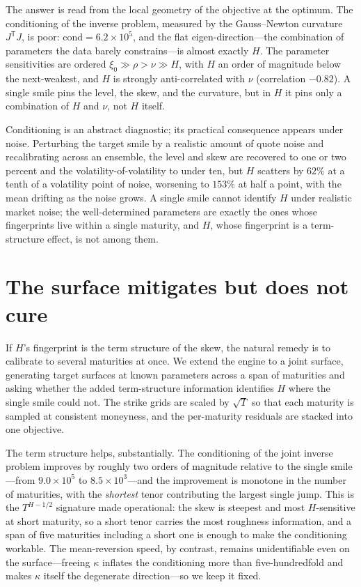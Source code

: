 \documentclass[11pt,a4paper]{article}
\numberwithin{equation}{section}
\begin{document}
The answer is read from the local geometry of the objective at the optimum. The conditioning of
the inverse problem, measured by the Gauss--Newton curvature $J^{\mathsf T}J$, is poor:
$\mathrm{cond}=6.2\times 10^{5}$, and the flat eigen-direction---the combination of parameters
the data barely constrains---is almost exactly $H$. The parameter sensitivities are ordered
$\xi_0 \gg \rho > \nu \gg H$, with $H$ an order of magnitude below the next-weakest, and $H$ is
strongly anti-correlated with $\nu$ (correlation $-0.82$). A single smile pins the level, the
skew, and the curvature, but in $H$ it pins only a combination of $H$ and $\nu$, not $H$ itself.

Conditioning is an abstract diagnostic; its practical consequence appears under noise. Perturbing
the target smile by a realistic amount of quote noise and recalibrating across an ensemble, the
level and skew are recovered to one or two percent and the volatility-of-volatility to under ten,
but $H$ scatters by $62\%$ at a tenth of a volatility point of noise, worsening to $153\%$ at half
a point, with the mean drifting as the noise grows. A single smile cannot identify $H$ under
realistic market noise; the well-determined parameters are exactly the ones whose fingerprints
live within a single maturity, and $H$, whose fingerprint is a term-structure effect, is not
among them.

\section{The surface mitigates but does not cure}\label{sec:surface}

If $H$'s fingerprint is the term structure of the skew, the natural remedy is to calibrate to
several maturities at once. We extend the engine to a joint surface, generating target surfaces
at known parameters across a span of maturities and asking whether the added term-structure
information identifies $H$ where the single smile could not. The strike grids are scaled by
$\sqrt{T}$ so that each maturity is sampled at consistent moneyness, and the per-maturity residuals
are stacked into one objective.

The term structure helps, substantially. The conditioning of the joint inverse problem improves by
roughly two orders of magnitude relative to the single smile---from $9.0\times 10^{5}$ to
$8.5\times 10^{3}$---and the improvement is monotone in the number of maturities, with the
\emph{shortest} tenor contributing the largest single jump. This is the $T^{H-1/2}$ signature made
operational: the skew is steepest and most $H$-sensitive at short maturity, so a short tenor carries
the most roughness information, and a span of five maturities including a short one is enough to make
the conditioning workable. The mean-reversion speed, by contrast, remains unidentifiable even on the
surface---freeing $\kappa$ inflates the conditioning more than five-hundredfold and makes $\kappa$
itself the degenerate direction---so we keep it fixed.
\end{document}
